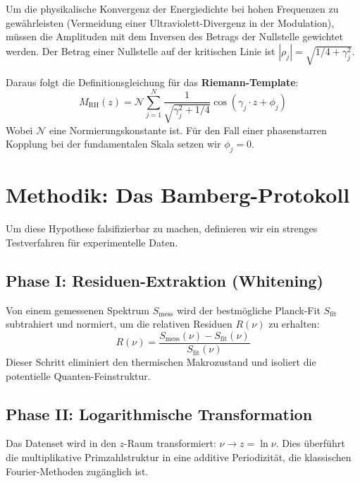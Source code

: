 \documentclass[11pt, a4paper]{article}
\begin{document}
	Um die physikalische Konvergenz der Energiedichte bei hohen Frequenzen zu gewährleisten (Vermeidung einer Ultraviolett-Divergenz in der Modulation), müssen die Amplituden mit dem Inversen des Betrags der Nullstelle gewichtet werden. Der Betrag einer Nullstelle auf der kritischen Linie ist $|\rho_j| = \sqrt{1/4 + \gamma_j^2}$.
	
	Daraus folgt die Definitionsgleichung für das \textbf{Riemann-Template}:
	\begin{equation}
		M_{\text{RH}}(z) = \mathcal{N} \sum_{j=1}^{N} \frac{1}{\sqrt{\gamma_j^2 + 1/4}} \cos(\gamma_j \cdot z + \phi_j)
	\end{equation}
	Wobei $\mathcal{N}$ eine Normierungskonstante ist. Für den Fall einer phasenstarren Kopplung bei der fundamentalen Skala setzen wir $\phi_j=0$.
	
	\section{Methodik: Das Bamberg-Protokoll}
	
	Um diese Hypothese falsifizierbar zu machen, definieren wir ein strenges Testverfahren für experimentelle Daten.
	
	\subsection{Phase I: Residuen-Extraktion (Whitening)}
	Von einem gemessenen Spektrum $S_{\text{mess}}$ wird der bestmögliche Planck-Fit $S_{\text{fit}}$ subtrahiert und normiert, um die relativen Residuen $R(\nu)$ zu erhalten:
	\begin{equation}
		R(\nu) = \frac{S_{\text{mess}}(\nu) - S_{\text{fit}}(\nu)}{S_{\text{fit}}(\nu)}
	\end{equation}
	Dieser Schritt eliminiert den thermischen Makrozustand und isoliert die potentielle Quanten-Feinstruktur.
	
	\subsection{Phase II: Logarithmische Transformation}
	Das Datenset wird in den $z$-Raum transformiert: $\nu \to z = \ln \nu$. Dies überführt die multiplikative Primzahlstruktur in eine additive Periodizität, die klassischen Fourier-Methoden zugänglich ist.
	
\end{document}
